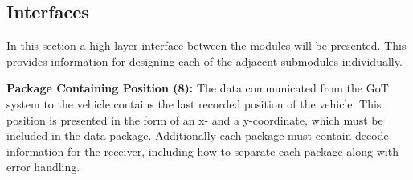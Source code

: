 

\subsection{Interfaces}
In this section a high layer interface between the modules will be presented. This provides information for designing each of the adjacent submodules individually.

\textbf{Package Containing Position (8):}
The data communicated from the GoT system to the vehicle contains the last recorded position of the vehicle. This position is presented in the form of an x- and a y-coordinate, which must be included in the data package. Additionally each package must contain decode information for the receiver, including how to separate each package along with error handling.

